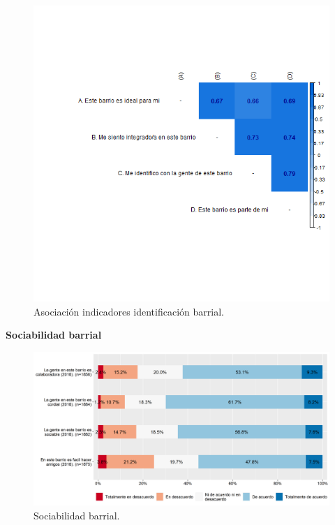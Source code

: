 \documentclass[
  12pt,
]{book}
\begin{document}
\begin{figure}[H]

{\centering \includegraphics[width=1\linewidth,height=1\textheight]{output/graphs/cohesion-barrial_cor} 

}

\caption{Asociación indicadores identificación barrial.}\label{fig:unnamed-chunk-5}
\end{figure}

\textbf{Sociabilidad barrial}

\begin{figure}[H]

{\centering \includegraphics[width=1\linewidth,height=1\textheight]{output/graphs/sociabilidad-barrial} 

}

\caption{Sociabilidad barrial.}\label{fig:unnamed-chunk-6}
\end{figure}
\end{document}
